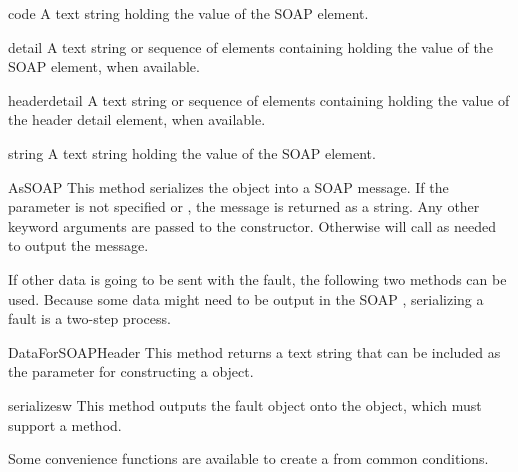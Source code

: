 \begin{memberdesc}{code}
A text string holding the value of the SOAP  element.
\end{memberdesc}

\begin{memberdesc}{detail}
A text string or sequence of elements containing holding the value of the
SOAP  element, when available.
\end{memberdesc}

\begin{memberdesc}{headerdetail}
A text string or sequence of elements containing holding the value of the
\ZSI{} header detail element, when available.
\end{memberdesc}

\begin{memberdesc}{string}
A text string holding the value of the SOAP  element.
\end{memberdesc}

\begin{methoddesc}{AsSOAP}{}
This method serializes the  object into a SOAP message.
If the  parameter is not specified or , the
message is returned as a string.
Any other keyword arguments are passed to the  constructor.
Otherwise  will call  as needed
to output the message.
\end{methoddesc}

If other data is going to be sent with the fault, the following
two methods can be used.
Because some data might need to be output in the SOAP ,
serializing a fault is a two-step process.

\begin{methoddesc}{DataForSOAPHeader}{}
This method returns a text string that can be included as the
 parameter for constructing a  object.
\end{methoddesc}

\begin{methoddesc}{serialize}{sw}
This method outputs the fault object onto the  object,
which must support a  method.
\end{methoddesc}

Some convenience functions are available to create a 
from common conditions.

